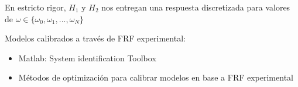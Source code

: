En estricto rigor, $H_1$ y $H_2$ nos entregan una respuesta discretizada para valores de $\omega \in \{\omega_0,\omega_1,...,\omega_N\}$\\

\par Modelos calibrados a través de FRF experimental:
\begin{itemize}
    \item Matlab: System identification Toolbox
    \item Métodos de optimización para calibrar modelos en base a FRF experimental
\end{itemize}

